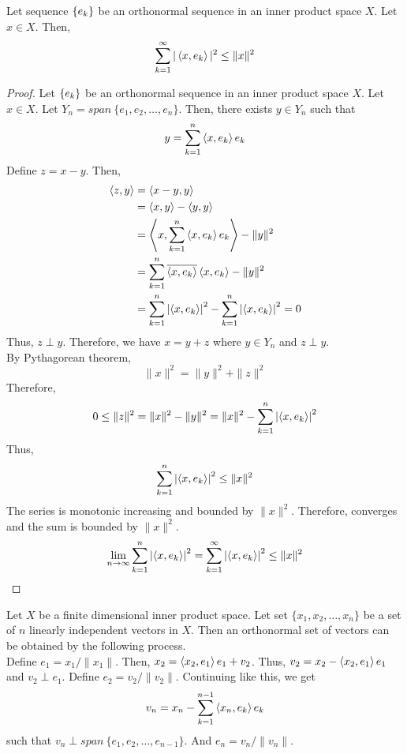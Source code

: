 \begin{theorem}
	Let sequence $\left\{e_k\right\}$ be an orthonormal sequence in an inner product space $X$.
	Let $x \in X$.
	Then,
	\[ \displaystyle \sum_{k=1}^\infty |\left\langle x,e_k \right\rangle|^2 \le \|x\|^2 \]
\end{theorem}
\begin{proof}
	Let $\left\{e_k\right\}$ be an orthonormal sequence in an inner product space $X$.
	Let $x \in X$.
	Let $Y_n = span\ \{e_1,e_2,\dots,e_n\}$.
	Then, there exists $y \in Y_n$ such that 
	\[ y = \sum_{k=1}^n \left\langle x,e_k \right\rangle e_k \]
	Define $z = x-y$.
	Then,
	\begin{align*}
		\left\langle z,y \right\rangle
		& = \left\langle x-y,y \right\rangle \\
		& = \left\langle x,y \right\rangle - \left\langle y,y \right\rangle \\
		& = \left\langle x,\sum_{k=1}^n \left\langle x,e_k \right\rangle e_k \right\rangle - \|y\|^2 \\
		& = \sum_{k=1}^n \overline{\left\langle x,e_k \right\rangle} \left\langle x,e_k \right\rangle - \|y\|^2 \\
		& = \sum_{k=1}^n \left|\left\langle x,e_k \right\rangle\right|^2 - \sum_{k=1}^n \left|\left\langle x,e_k \right\rangle\right|^2 = 0
	\end{align*}
	Thus, $z \perp y$.
	Therefore, we have $x = y+z$ where $y \in Y_n$ and $z \perp y$.\\

	By Pythagorean theorem,
	\[ \|x\|^2 = \|y\|^2 + \|z\|^2 \]
	Therefore,
	\[ 0 \le \|z\|^2 = \|x\|^2 - \|y\|^2 = \|x\|^2 - \sum_{k=1}^n \left| \left\langle x,e_k \right\rangle \right|^2 \]
	Thus,
	\[ \sum_{k=1}^n \left| \left\langle x,e_k \right\rangle \right|^2 \le \|x\|^2 \]
	The series is monotonic increasing and bounded by $\|x\|^2$.
	Therefore, converges and the sum is bounded by $\|x\|^2$.
	\[ \lim_{n \to \infty} \sum_{k=1}^n \left| \left\langle x,e_k \right\rangle \right|^2 = \sum_{k=1}^\infty \left|\left\langle x,e_k \right\rangle\right|^2 \le \|x\|^2 \]
\end{proof}

\begin{remark}
	Let $X$ be a finite dimensional inner product space.
	Let set $\{x_1,x_2,\dots,x_n\}$ be a set of $n$ linearly independent vectors in $X$.
	Then an orthonormal set of vectors can be obtained by the following process.\\

	Define $e_1 = x_1/\|x_1\|$.
	Then, $x_2 = \left\langle x_2,e_1 \right\rangle e_1 + v_2$.
	Thus, $v_2 = x_2 - \left\langle x_2,e_1 \right\rangle e_1$ and $v_2 \perp e_1$.
	Define $e_2 = v_2/\|v_2\|$.
	Continuing like this, we get
	\[ v_n = x_n - \sum_{k=1}^{n-1}\left\langle x_n,e_k \right\rangle e_k \]
	such that $v_n \perp span\ \{e_1,e_2,\dots,e_{n-1}\}$.
	And $e_n = v_n/\|v_n\|$.
\end{remark}

